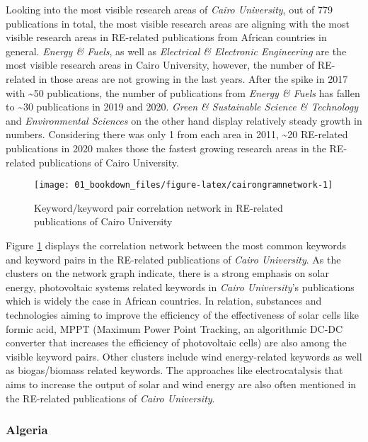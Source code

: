 \documentclass[12pt,twoside]{report}
\begin{document}
Looking into the most visible research areas of \emph{Cairo University}, out of 779 publications in total, the most visible research areas are aligning with the most visible research areas in RE-related publications from African countries in general. \emph{Energy \& Fuels}, as well as \emph{Electrical \& Electronic Engineering} are the most visible research areas in Cairo University, however, the number of RE-related in those areas are not growing in the last years. After the spike in 2017 with \textasciitilde50 publications, the number of publications from \emph{Energy \& Fuels} has fallen to \textasciitilde30 publications in 2019 and 2020. \emph{Green \& Sustainable Science \& Technology} and \emph{Environmental Sciences} on the other hand display relatively steady growth in numbers. Considering there was only 1 from each area in 2011, \textasciitilde20 RE-related publications in 2020 makes those the fastest growing research areas in the RE-related publications of Cairo University.

\begin{figure}
\texttt{[image: 01\_bookdown\_files/figure-latex/cairongramnetwork-1]} \caption{Keyword/keyword pair correlation network in RE-related publications of Cairo University}\label{fig:cairongramnetwork}
\end{figure}

Figure \ref{fig:cairongramnetwork} displays the correlation network between the most common keywords and keyword pairs in the RE-related publications of \emph{Cairo University}. As the clusters on the network graph indicate, there is a strong emphasis on solar energy, photovoltaic systems related keywords in \emph{Cairo University}'s publications which is widely the case in African countries. In relation, substances and technologies aiming to improve the efficiency of the effectiveness of solar cells like formic acid, MPPT (Maximum Power Point Tracking, an algorithmic DC-DC converter that increases the efficiency of photovoltaic cells) are also among the visible keyword pairs. Other clusters include wind energy-related keywords as well as biogas/biomass related keywords. The approaches like electrocatalysis that aims to increase the output of solar and wind energy are also often mentioned in the RE-related publications of \emph{Cairo University}.

\hypertarget{algeria}{%
\subsubsection{Algeria}\label{algeria}}
\end{document}
